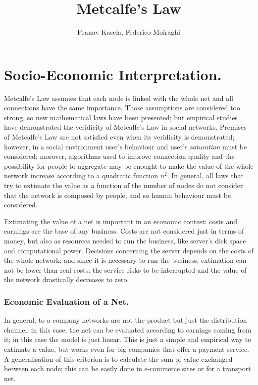 \documentclass[12pt, a4page]{article}
\title{Metcalfe's Law}
\date{}
\author{Pranav Kasela, Federico Moiraghi}
\begin{document}
\maketitle

\part*{Socio-Economic Interpretation.}
Metcalfe's Law assumes that each node is linked with the whole net and all connections have the same importance.
Those assumptions are considered too strong, so new mathematical laws have been presented; but empirical studies have demonstrated the veridicity of Metcalfe's Law in social networks. \newline %
Premises of Metcalfe's Law are not satisfied even when its veridicity is demonstrated; however, in a social environment user's behaviour and user's \textit{saturation} must be considered; morover, algorithms used to improve connection quality and the possibility for people to aggregate may be enought to make the value of the whole network increase according to a quadratic function $n^2$. \newline
In general, all laws that try to extimate the value as a function of the number of nodes do not consider that the network is composed by people, and so human behaviour must be considered. \newline

Extimating the value of a net is important in an economic contest: costs and earnings are the base of any business. Costs are not considered just in terms of money, but also as resources needed to run the business, like server's disk space and computational power.
Decisions concerning the server depends on the costs of the whole network; and since it is necessary to run the business, extimation can not be lower than real costs: the service risks to be interrupted and the value of the network drastically decreases to zero. \newline

\section{Economic Evaluation of a Net.}
In general, to a company networks are not the product but just the distribution channel: in this case, the net can be evaluated according to earnings coming from it; in this case the model is just linear.
This is just a simple and empirical way to extimate a value, but works even for big companies that offer a payment service. \newline
A generalisation of this criterion is to calculate the sum of value exchanged between each node; this can be easily done in e-commerce sites or for a transport net. \newline%
\end{document}
